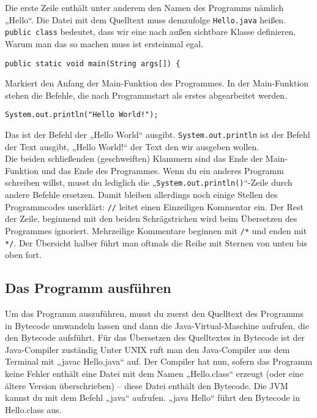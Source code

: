 Die erste Zeile enthält unter anderem den Namen des Programms nämlich „Hello“. Die Datei mit dem Quelltext muss demzufolge \lstinline$Hello.java$ heißen. \lstinline$public class$ bedeutet, dass wir eine nach außen sichtbare Klasse definieren. Warum man das so machen muss ist ersteinmal egal.\\
\begin{lstlisting}
public static void main(String args[]) {
\end{lstlisting}
Markiert den Anfang der Main-Funktion des Programmes. In der Main-Funktion stehen die Befehle, die nach Programmstart als erstes abgearbeitet werden. \\
\begin{lstlisting}
System.out.println("Hello World!");
\end{lstlisting}
Das ist der Befehl der „Hello World“ ausgibt. \lstinline$System.out.println$ ist der Befehl der Text ausgibt, „Hello World!“ der Text den wir ausgeben wollen. \\
Die beiden schließenden (geschweiften) Klammern sind das Ende der Main-Funktion und das Ende des Programmes. 
Wenn du ein anderes Programm schreiben willst, musst du lediglich die „\lstinline$System.out.println()$“-Zeile durch andere Befehle ersetzen.
Damit bleiben allerdings noch einige Stellen des Programmcodes unerklärt: \lstinline$//$ leitet einen Einzeiligen Kommentar ein. Der Rest der Zeile, beginnend mit den beiden Schrägstrichen wird beim Übersetzen des Programmes ignoriert.
Mehrzeilige Kommentare beginnen mit \lstinline$/*$ und enden mit \lstinline$*/$. Der Übersicht halber führt man oftmals die Reihe mit Sternen von unten bis oben fort.


\subsection{Das Programm ausführen}
Um das Programm auszuführen, musst du zuerst den Quelltext des Programms in Bytecode umwandeln lassen und dann die Java-Virtual-Maschine aufrufen, die den Bytecode aufsführt. 
Für das Übersetzen des Quelltextes in Bytecode ist der Java-Compiler zuständig
Unter UNIX ruft man den Java-Compiler aus dem Terminal mit „javac Hello.java“ auf. Der Compiler hat nun, sofern das Programm keine Fehler enthält eine Datei mit dem Namen „Hello.class“ erzeugt (oder eine ältere Version überschrieben) – diese Datei enthält den Bytecode.
Die JVM kannst du mit dem Befehl „java“ aufrufen. „java Hello“ führt den Bytecode in Hello.class aus.

